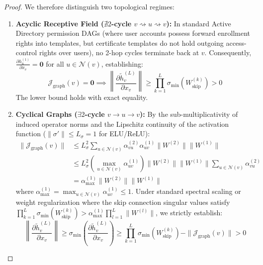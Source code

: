 \begin{proof}
We therefore distinguish two topological regimes:
\begin{enumerate}
    \item \textbf{Acyclic Receptive Field ($\nexists 2$-cycle $v \rightsquigarrow u \rightsquigarrow v$):} In standard Active Directory permission DAGs (where user accounts possess forward enrollment rights into templates, but certificate templates do not hold outgoing access-control rights over users), no 2-hop cycles terminate back at $v$. Consequently, $\frac{\partial h_u^{(1)}}{\partial x_v} = \mathbf{0}$ for all $u \in \mathcal{N}(v)$, establishing:
    \begin{equation}
    \mathcal{J}_{\text{graph}}(v) = \mathbf{0} \implies \left\| \frac{\partial \tilde{h}_v^{(L)}}{\partial x_v} \right\| \ge \prod_{k=1}^L \sigma_{\min}(W_{\text{skip}}^{(k)}) > 0
    \end{equation}
    The lower bound holds with exact equality.
    \item \textbf{Cyclical Graphs ($\exists 2$-cycle $v \to u \to v$):} By the sub-multiplicativity of induced operator norms and the Lipschitz continuity of the activation function ($\|\sigma'\| \le L_\sigma = 1$ for ELU/ReLU):
    \begin{align}
    \|\mathcal{J}_{\text{graph}}(v)\| &\le L_\sigma^2 \sum_{u \in \mathcal{N}(v)} \alpha_{vu}^{(2)} \alpha_{uv}^{(1)} \|W^{(2)}\| \|W^{(1)}\| \\
    &\le L_\sigma^2 \left( \max_{u \in \mathcal{N}(v)} \alpha_{uv}^{(1)} \right) \|W^{(2)}\| \|W^{(1)}\| \sum_{u \in \mathcal{N}(v)} \alpha_{vu}^{(2)} \\
    &= \alpha_{\max}^{(1)} \|W^{(2)}\| \|W^{(1)}\|
    \end{align}
    where $\alpha_{\max}^{(1)} = \max_{u \in \mathcal{N}(v)} \alpha_{uv}^{(1)} \le 1$. Under standard spectral scaling or weight regularization where the skip connection singular values satisfy $\prod_{k=1}^L \sigma_{\min}(W_{\text{skip}}^{(k)}) > \alpha_{\max}^{(1)} \prod_{l=1}^L \|W^{(l)}\|$, we strictly establish:
    \begin{equation}
    \left\| \frac{\partial \tilde{h}_v^{(L)}}{\partial x_v} \right\| \ge \sigma_{\min} \left( \frac{\partial \tilde{h}_v^{(L)}}{\partial x_v} \right) \ge \prod_{k=1}^L \sigma_{\min}(W_{\text{skip}}^{(k)}) - \|\mathcal{J}_{\text{graph}}(v)\| > 0
    \end{equation}
\end{enumerate}


\end{proof}
